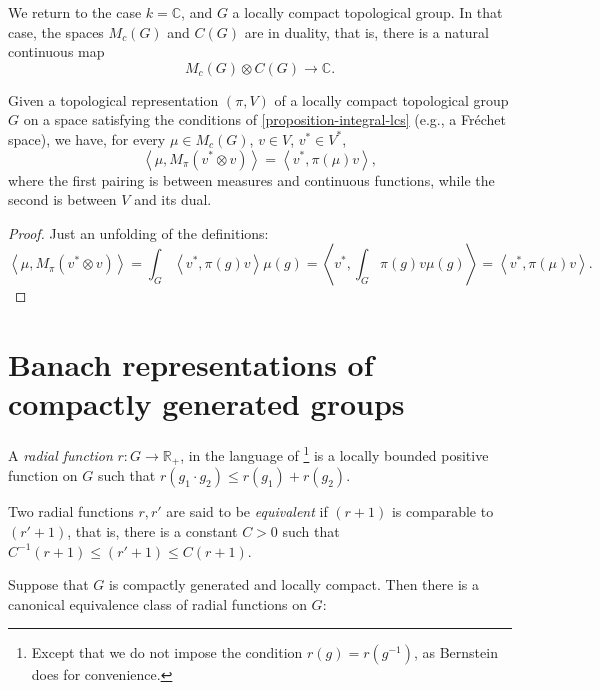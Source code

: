 We return to the case $k=\mathbb C$, and $G$ a locally compact topological group. In that case, the spaces $M_c(G)$ and $C(G)$ are in duality, that is, there is a natural continuous map
$$ M_c(G) \otimes C(G) \to \mathbb C.$$

\begin{lemma}
 \label{lemma-mc-dualto-operator}
Given a topological representation $(\pi, V)$ of  a locally compact topological group $G$ on a space satisfying the conditions of \ref{proposition-integral-lcs} (e.g., a Fr\'echet space), we have, for every $\mu\in M_c(G)$, $v\in V$, $v^*\in V^*$,
\begin{equation}
 \label{equation-mc-dualto-operator}
\left< \mu , M_\pi (v^*\otimes v)\right> = \left< v^*, \pi(\mu) v \right>,
\end{equation}
where the first pairing is between measures and continuous functions, while the second is between $V$ and its dual.
\end{lemma}

\begin{proof}
 Just an unfolding of the definitions:
$$\left< \mu , M_\pi (v^*\otimes v)\right> =  \int_G \left< v^*, \pi(g) v\right>  \mu(g) = \left< v^*, \int_G \pi(g) v \mu(g) \right> = \left< v^* , \pi(\mu) v\right>.$$
\end{proof}







 
 
\section{Banach representations of compactly generated groups}
\label{section-Banach-representations}

\begin{definition}
\label{definition-radial-function}
 A {\it radial function} $r: G\to \mathbb R_+$, in the language of 
 \cite{Bernstein-Plancherel}\footnote{Except that we do not impose the condition $r(g)=r(g^{-1})$, as Bernstein does for convenience.}
is a locally bounded positive function on $G$ such that $r(g_1\cdot g_2) \le r(g_1) + r(g_2)$. 

Two radial functions $r, r'$ are said to be {\it equivalent} if $(r+1)$ is comparable to $(r'+1)$, that is, there is a constant $C>0$ such that $C^{-1} (r+1)\le (r'+1) \le C (r+1)$.
\end{definition}

Suppose that $G$ is compactly generated and locally compact. Then there is a canonical equivalence class of radial functions on $G$:

